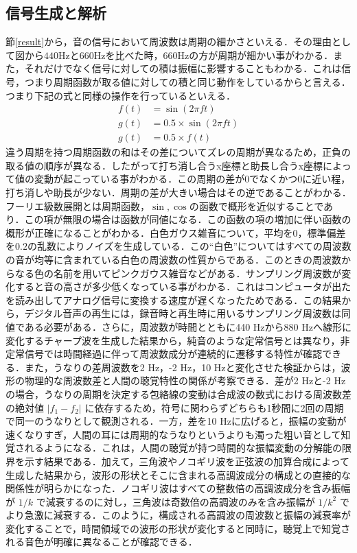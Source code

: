 \documentclass[paper=a4, fontsize=10pt]{jlreq}
\begin{document}
\subsection{信号生成と解析}
節\ref{result}から，音の信号において周波数は周期の細かさといえる．その理由として図から$440$Hzと$660$Hzを比べた時，$660$Hzの方が周期が細かい事がわかる．また，それだけでなく信号に対しての積は振幅に影響することもわかる．これは信号，つまり周期函数が取る値に対しての積と同じ動作をしているからと言える．つまり下記の式と同様の操作を行っているといえる．
\begin{align*}
  f(t) &= \sin(2\pi ft) \\
  g(t) &= 0.5 \times \sin(2\pi ft) \\
  g(t) &= 0.5 \times f(t)
\end{align*}
違う周期を持つ周期函数の和はその差についてズレの周期が異なるため，正負の取る値の順序が異なる．したがって打ち消し合うx座標と助長し合うx座標によって値の変動が起こっている事がわかる．この周期の差が$0$でなくかつ$0$に近い程，打ち消しや助長が少ない．周期の差が大きい場合はその逆であることがわかる．フーリエ級数展開とは周期函数，$\sin , \cos$の函数で概形を近似することであり．この項が無限の場合は函数が同値になる．この函数の項の増加に伴い函数の概形が正確になることがわかる．白色ガウス雑音について，平均を$0$，標準偏差を$0.2$の乱数によりノイズを生成している．この``白色''についてはすべての周波数の音が均等に含まれている白色の周波数の性質からである．このときの周波数からなる色の名前を用いてピンクガウス雑音などがある．サンプリング周波数が変化すると音の高さが多少低くなっている事がわかる．これはコンピュータが出たを読み出してアナログ信号に変換する速度が遅くなったためである．この結果から，デジタル音声の再生には，録音時と再生時に用いるサンプリング周波数は同値である必要がある\cite{mathworks}．さらに，周波数が時間とともに440 Hzから880 Hzへ線形に変化するチャープ波を生成した結果から，純音のような定常信号とは異なり，非定常信号では時間経過に伴って周波数成分が連続的に遷移する特性が確認できる．また，うなりの差周波数を2 Hz，-2 Hz，10 Hzと変化させた検証からは，波形の物理的な周波数差と人間の聴覚特性の関係が考察できる．差が2 Hzと-2 Hzの場合，うなりの周期を決定する包絡線の変動は合成波の数式における周波数差の絶対値 $\vert{}f_1 - f_2\vert{}$ に依存するため，符号に関わらずどちらも1秒間に2回の周期で同一のうなりとして観測される．一方，差を10 Hzに広げると，振幅の変動が速くなりすぎ，人間の耳には周期的なうなりというよりも濁った粗い音として知覚されるようになる．これは，人間の聴覚が持つ時間的な振幅変動の分解能の限界を示す結果である．加えて，三角波やノコギリ波を正弦波の加算合成によって生成した結果から，波形の形状とそこに含まれる高調波成分の構成との直接的な関係性が明らかになった．ノコギリ波はすべての整数倍の高調波成分を含み振幅が $1/k$ で減衰するのに対し，三角波は奇数倍の高調波のみを含み振幅が $1/k^2$ でより急激に減衰する．このように，構成される高調波の周波数と振幅の減衰率が変化することで，時間領域での波形の形状が変化すると同時に，聴覚上で知覚される音色が明確に異なることが確認できる．
\end{document}
